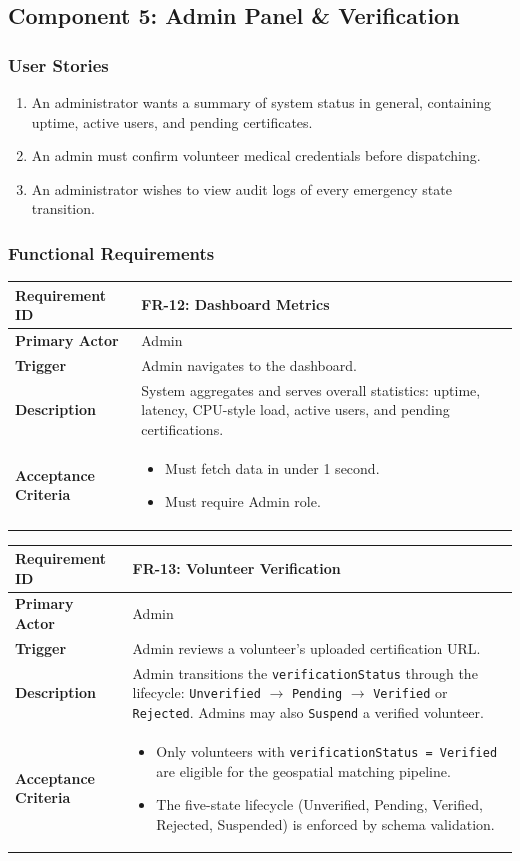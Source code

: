\documentclass[12pt,a4paper]{article}
\newcommand{\frbox}[5]{%
  \begin{table}[H]
  \centering
  \begin{tabularx}{\textwidth}{|l|X|}
  \hline
  \rowcolor{lightorange}
  \textbf{Requirement ID} & \textbf{#1} \\
  \hline
  \textbf{Primary Actor} & #2 \\
  \hline
  \textbf{Trigger} & #3 \\
  \hline
  \textbf{Description} & #4 \\
  \hline
  \rowcolor{lightorange}
  \textbf{Acceptance Criteria} & #5 \\
  \hline
  \end{tabularx}
  \end{table}
}
\begin{document}
\subsection{Component 5: Admin Panel \& Verification}

\subsubsection*{User Stories}
\begin{enumerate}[leftmargin=2em]
  \item An administrator wants a summary of system status in general, containing uptime, active users, and pending certificates.
  \item An admin must confirm volunteer medical credentials before dispatching.
  \item An administrator wishes to view audit logs of every emergency state transition.
\end{enumerate}

\subsubsection*{Functional Requirements}

\frbox{FR-12: Dashboard Metrics}
{Admin}
{Admin navigates to the dashboard.}
{System aggregates and serves overall statistics: uptime, latency, CPU-style load, active users, and pending certifications.}
{%
\begin{itemize}[leftmargin=1.5em]
  \item Must fetch data in under 1 second.
  \item Must require Admin role.
\end{itemize}
}

\frbox{FR-13: Volunteer Verification}
{Admin}
{Admin reviews a volunteer's uploaded certification URL.}
{Admin transitions the \texttt{verificationStatus} through the lifecycle: \texttt{Unverified} $\rightarrow$ \texttt{Pending} $\rightarrow$ \texttt{Verified} or \texttt{Rejected}. Admins may also \texttt{Suspend} a verified volunteer.}
{%
\begin{itemize}[leftmargin=1.5em]
  \item Only volunteers with \texttt{verificationStatus = Verified} are eligible for the geospatial matching pipeline.
  \item The five-state lifecycle (Unverified, Pending, Verified, Rejected, Suspended) is enforced by schema validation.
\end{itemize}
}
\end{document}

